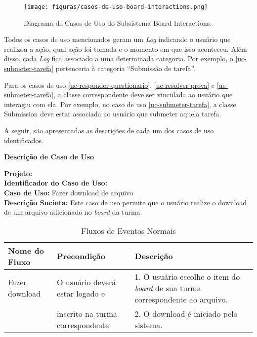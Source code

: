 \begin{figure}[h!]
	\centering
	\texttt{[image: figuras/casos-de-uso-board-interactions.png]}
	\caption{Diagrama de Casos de Uso do Subsistema Board Interactions.}
	\label{figura-caso-de-uso-board-interactions}
\end{figure}

Todos os casos de uso mencionados geram um \textit{Log} indicando o usuário que realizou a ação, qual ação foi tomada e o momento em que isso aconteceu. Além disso, cada \textit{Log} fica associado a uma determinada categoria. Por exemplo, o \ref{uc-submeter-tarefa} pertenceria à categoria ``Submissão de tarefa''.

Para os casos de uso \ref{uc-responder-questionario}, \ref{uc-resolver-prova} e \ref{uc-submeter-tarefa}, a classe correspondente deve ser vinculada ao usuário que interagiu com ela. Por exemplo, no caso de uso \ref{uc-submeter-tarefa}, a classe Submission deve estar associada ao usuário que submeter aquela tarefa.

A seguir, são apresentadas as descrições de cada um dos casos de uso identificados. 


\clearpage
\begin{flushright}    \textbf{Descrição de Caso de Uso}   \end{flushright}         
\noindent \textbf{Projeto:} \imprimirtitulo  \\
\textbf{Identificador do Caso de Uso:} \UC\label{uc-download-arquivo} \\
\textbf{Caso de Uso:} Fazer download de arquivo \\
\noindent \textbf{Descrição Sucinta:} Este caso de uso permite que o usuário realize o download de um arquivo adicionado no \textit{board} da turma.\\

\begin{table}[H]
	\centering \vspace{0.5cm} \footnotesize
	\caption{Fluxos de Eventos Normais}
	\begin{tabular}{|p{2.3cm}|p{2.5cm}|p{10cm}|} \hline  \rowcolor[rgb]{0.8,0.8,0.8}
		
		Nome do Fluxo & Precondição & Descrição  \\ \hline		
		
		Fazer download & O usuário deverá estar logado e & 1. O usuário escolhe o item do \textit{board} de sua turma correspondente ao arquivo.  \\
		{}    & inscrito na turma correspondente & 2.  O download é iniciado pelo sistema.\\ \hline 
	\end{tabular}
\end{table}


